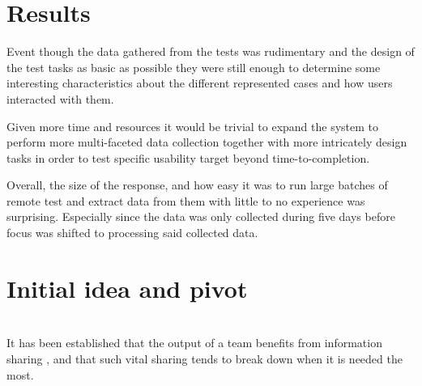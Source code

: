 %


\section{Results}

  Event though the data gathered from the tests was rudimentary and the
  design of the test tasks as basic as possible they were still enough to
  determine some interesting characteristics about the different represented
  cases and how users interacted with them.


  Given more time and resources it would be trivial to expand the system to
  perform more multi-faceted data collection together with more intricately
  design tasks in order to test specific usability target beyond
  time-to-completion.

  Overall, the size of the response, and how easy it was to run large batches
  of remote test and extract data from them with little to no experience was
  surprising. Especially since the data was only collected during five days
  before focus was shifted to processing said collected data.

%
\section{Initial idea and pivot}

   \\
  It has been established that the output of a team benefits from information
  sharing\cite{%
  citeInformationSharingTeamPerformanceMeta,%
  citeContextualizedRelationshipBetweenKnowledgeSharingandPerformanceinSoftwareDevelopment%
  }
  , and that such vital sharing tends to break down when it is needed
  the most\cite{citeInformationSharingTeamPerformanceMeta}.

